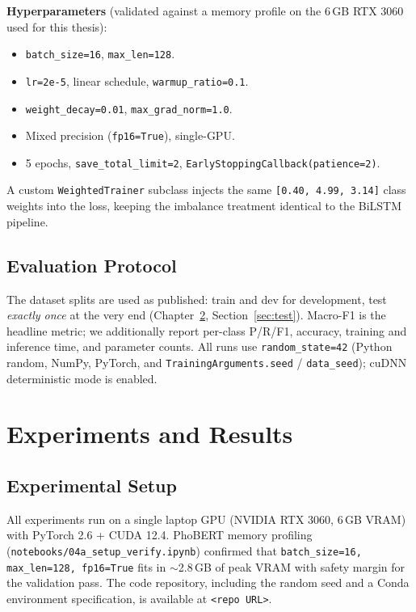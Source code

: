 \documentclass[a4paper,12pt,oneside]{report}
\begin{document}
\textbf{Hyperparameters} (validated against a memory profile on the
6\,GB RTX 3060 used for this thesis):
\begin{itemize}
  \item \texttt{batch\_size=16}, \texttt{max\_len=128}.
  \item \texttt{lr=2e-5}, linear schedule, \texttt{warmup\_ratio=0.1}.
  \item \texttt{weight\_decay=0.01}, \texttt{max\_grad\_norm=1.0}.
  \item Mixed precision (\texttt{fp16=True}), single-GPU.
  \item 5 epochs, \texttt{save\_total\_limit=2},
        \texttt{EarlyStoppingCallback(patience=2)}.
\end{itemize}

A custom \texttt{WeightedTrainer} subclass injects the same
\texttt{[0.40, 4.99, 3.14]} class weights into the loss, keeping the
imbalance treatment identical to the BiLSTM pipeline.

\section{Evaluation Protocol}
\label{sec:protocol}
The dataset splits are used as published: train and dev for development,
test \emph{exactly once} at the very end (Chapter~\ref{ch:results},
Section~\ref{sec:test}).
Macro-F1 is the headline metric; we additionally report
per-class P/R/F1, accuracy, training and inference time, and parameter
counts. All runs use \texttt{random\_state=42} (Python random, NumPy,
PyTorch, and \texttt{TrainingArguments.seed} / \texttt{data\_seed}); cuDNN
deterministic mode is enabled.

\chapter{Experiments and Results}
\label{ch:results}

\section{Experimental Setup}
All experiments run on a single laptop GPU (NVIDIA RTX 3060, 6\,GB VRAM)
with PyTorch 2.6 + CUDA 12.4. PhoBERT memory profiling
(\texttt{notebooks/04a\_setup\_verify.ipynb}) confirmed that
\texttt{batch\_size=16, max\_len=128, fp16=True} fits in $\sim$2.8\,GB
of peak VRAM with safety margin for the validation pass. The code
repository, including the random seed and a Conda environment
specification, is available at
\texttt{<repo URL>}.
\end{document}
